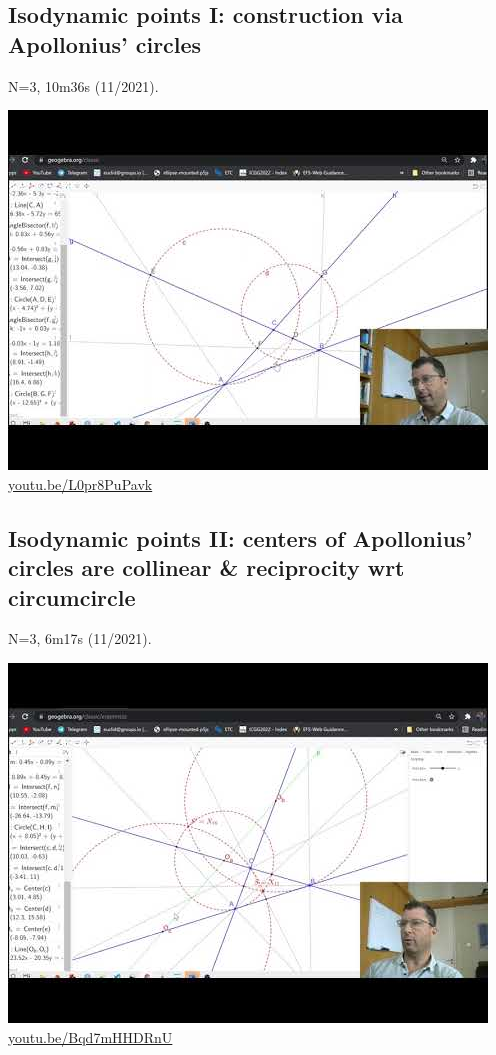 \documentclass[12pt]{amsart}
\begin{document}
\subsection{Isodynamic points I: construction via Apollonius' circles}
\label{vid:L0pr8PuPavk}
\noindent N=3, 10m36s (11/2021). 
\begin{center}\includegraphics[width=.5\textwidth]{pics/L0pr8PuPavk.jpg} \\ 
\href{https://youtu.be/L0pr8PuPavk}{\url{youtu.be/L0pr8PuPavk}}\end{center}
% 

\subsection{Isodynamic points II: centers of Apollonius' circles are collinear \& reciprocity wrt circumcircle}
\label{vid:Bqd7mHHDRnU}
\noindent N=3, 6m17s (11/2021). 
\begin{center}\includegraphics[width=.5\textwidth]{pics/Bqd7mHHDRnU.jpg} \\ 
\href{https://youtu.be/Bqd7mHHDRnU}{\url{youtu.be/Bqd7mHHDRnU}}\end{center}
% 
\end{document}
